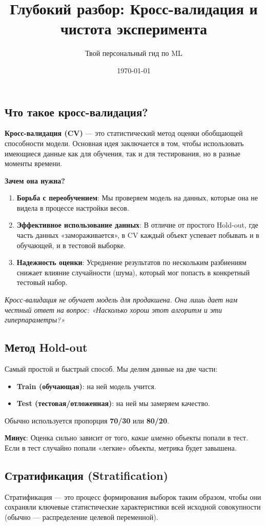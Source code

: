 \documentclass[12pt]{article}
\title{Глубокий разбор: Кросс-валидация и чистота эксперимента}
\author{Твой персональный гид по ML}
\date{\today}
\newcommand{\commentary}[1]{{\small\itshape\color{commentgray} #1}}
\begin{document}
\subsection{Что такое кросс-валидация?}
\textbf{Кросс-валидация (CV)} — это статистический метод оценки обобщающей способности модели. Основная идея заключается в том, чтобы использовать имеющиеся данные как для обучения, так и для тестирования, но в разные моменты времени.

\textbf{Зачем она нужна?}
\begin{enumerate}
    \item \textbf{Борьба с переобучением}: Мы проверяем модель на данных, которые она не видела в процессе настройки весов.
    \item \textbf{Эффективное использование данных}: В отличие от простого Hold-out, где часть данных «замораживается», в CV каждый объект успевает побывать и в обучающей, и в тестовой выборке.
    \item \textbf{Надежность оценки}: Усреднение результатов по нескольким разбиениям снижает влияние случайности (шума), который мог попасть в конкретный тестовый набор.
\end{enumerate}

\commentary{Кросс-валидация не обучает модель для продакшена. Она лишь дает нам честный ответ на вопрос: «Насколько хорош этот алгоритм и эти гиперпараметры?»}

\subsection{Метод Hold-out}
Самый простой и быстрый способ. Мы делим данные на две части:
\begin{itemize}
    \item \textbf{Train (обучающая)}: на ней модель учится.
    \item \textbf{Test (тестовая/отложенная)}: на ней мы замеряем качество.
\end{itemize}
Обычно используется пропорция \textbf{70/30} или \textbf{80/20}. 

\textbf{Минус}: Оценка сильно зависит от того, \textit{какие именно} объекты попали в тест. Если в тест случайно попали «легкие» объекты, метрика будет завышена.

\subsection{Стратификация (Stratification)}
Стратификация — это процесс формирования выборок таким образом, чтобы они сохраняли ключевые статистические характеристики всей исходной совокупности (обычно — распределение целевой переменной).
\end{document}
